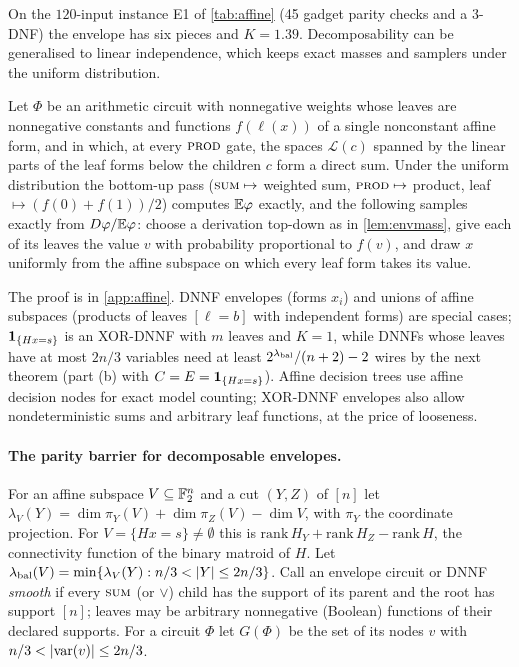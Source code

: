 On the $120$-input instance E1 of \cref{tab:affine} (45 gadget parity checks and a
3-DNF) the envelope has six pieces and $K=1.39$.
Decomposability can be generalised to linear independence, which keeps exact masses
and samplers under the uniform distribution.

\begin{proposition}\label{prop:xordnnf}
Let $\Phi$ be an arithmetic circuit with nonnegative weights whose leaves are
nonnegative constants and functions $f(\ell(x))$ of a single nonconstant affine form,
and in which, at every $\textsc{prod}$ gate, the spaces $\mathcal L(c)$ spanned by the linear
parts of the leaf forms below the children $c$ form a direct sum. Under the uniform
distribution the bottom-up pass ($\textsc{sum}\mapsto$ weighted sum, $\textsc{prod}\mapsto$ product,
leaf $\mapsto(f(0)+f(1))/2$) computes $\mathbb{E}\varphi$ exactly, and the following samples
exactly from $D\varphi/\mathbb{E}\varphi$: choose a derivation top-down as in
\cref{lem:envmass}, give each of its leaves the value $v$ with probability
proportional to $f(v)$, and draw $x$ uniformly from the affine subspace on which every
leaf form takes its value.
\end{proposition}

The proof is in \cref{app:affine}. DNNF envelopes (forms $x_i$) and unions of affine
subspaces (products of leaves $[\ell=b]$ with independent forms) are special cases;
$\mathbf{1}_{\{Hx=s\}}$ is an XOR-DNNF with $m$ leaves and $K=1$, while DNNFs whose leaves
have at most $2n/3$ variables need at least $2^{\lambda_{\rm bal}}/(n+2)-2$ wires by the
next theorem (part (b) with $C=E=\mathbf{1}_{\{Hx=s\}}$). Affine decision trees \cite{koriche2013}
use affine decision nodes for exact model counting; XOR-DNNF envelopes also allow
nondeterministic sums and arbitrary leaf functions, at the price of looseness.

\paragraph{The parity barrier for decomposable envelopes.}
For an affine subspace $V\subseteq\mathbb{F}_2^n$ and a cut $(Y,Z)$ of $[n]$ let
$\lambda_V(Y)=\dim\pi_Y(V)+\dim\pi_Z(V)-\dim V$, with $\pi_Y$ the coordinate
projection. For $V=\{Hx=s\}\ne\emptyset$ this is
$\mathrm{rank}\,H_Y+\mathrm{rank}\,H_Z-\mathrm{rank}\,H$, the connectivity function of
the binary matroid of $H$. Let
$\lambda_{\rm bal}(V)=\min\{\lambda_V(Y):n/3<|Y|\le2n/3\}$. Call an envelope circuit or
DNNF \emph{smooth} if every $\textsc{sum}$ (or $\vee$) child has the support of its parent
and the root has support $[n]$; leaves may be arbitrary nonnegative (Boolean)
functions of their declared supports. For a circuit $\Phi$ let $G(\Phi)$ be the set
of its nodes $v$ with $n/3<|\sv(v)|\le2n/3$.

